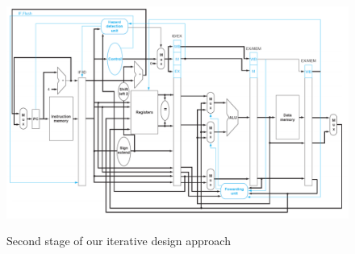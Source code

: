 \begin{figure}[h]
	\centering
	\caption{Second stage of our iterative design approach}
	\includegraphics[width=1.25\linewidth]{figures/design2.png}
	\label{fig:final-2-2}
\end{figure}